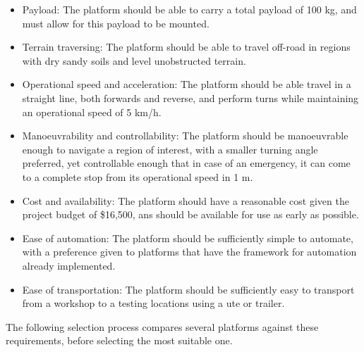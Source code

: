 \documentclass[main.tex]{subfiles}
\begin{document}
\begin{appendices}
\begin{itemize}
 \item Payload: The platform should be able to carry a total payload of 100 kg, and must allow for this payload to be mounted.
 \item Terrain traversing: The platform should be able to travel off-road in regions with dry sandy soils and level unobstructed terrain.
\item  Operational speed and acceleration: The platform should be able travel in a straight line, both forwards and reverse, and perform turns while maintaining an operational speed of 5 km/h.
\item Manoeuvrability and controllability: The platform should be manoeuvrable enough to navigate a region of interest, with a smaller turning angle preferred, yet controllable enough that in case of an emergency, it can come to a complete stop from its operational speed in 1 m.
\item Cost and availability: The platform should have a reasonable cost given the project budget of \$16,500, ans should be available for use as early as possible. 
\item Ease of automation: The platform should be sufficiently simple to automate, with a preference given to platforms that have the framework for automation already implemented. 
\item Ease of transportation: The platform should be sufficiently easy to transport from a workshop to a testing locations using a ute or trailer.
\end{itemize}
The following selection process compares several platforms against these requirements, before selecting the most suitable one. 


\end{appendices}
\end{document}
